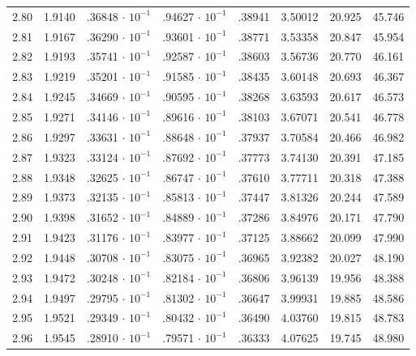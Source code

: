 \begin{minipage}{0.525\textwidth}
{\begin{tabular}{c|c|c|c|c|c|c|c}
        2.80 & 1.9140 & .36848$\,\cdot\,10^{-1}$ & .94627$\,\cdot\,10^{-1}$ & .38941 & 3.50012 & 20.925 & 45.746 \\
        2.81 & 1.9167 & .36290$\,\cdot\,10^{-1}$ & .93601$\,\cdot\,10^{-1}$ & .38771 & 3.53358 & 20.847 & 45.954 \\
        2.82 & 1.9193 & .35741$\,\cdot\,10^{-1}$ & .92587$\,\cdot\,10^{-1}$ & .38603 & 3.56736 & 20.770 & 46.161 \\
        2.83 & 1.9219 & .35201$\,\cdot\,10^{-1}$ & .91585$\,\cdot\,10^{-1}$ & .38435 & 3.60148 & 20.693 & 46.367 \\
        2.84 & 1.9245 & .34669$\,\cdot\,10^{-1}$ & .90595$\,\cdot\,10^{-1}$ & .38268 & 3.63593 & 20.617 & 46.573 \\
        2.85 & 1.9271 & .34146$\,\cdot\,10^{-1}$ & .89616$\,\cdot\,10^{-1}$ & .38103 & 3.67071 & 20.541 & 46.778 \\
        2.86 & 1.9297 & .33631$\,\cdot\,10^{-1}$ & .88648$\,\cdot\,10^{-1}$ & .37937 & 3.70584 & 20.466 & 46.982 \\
        2.87 & 1.9323 & .33124$\,\cdot\,10^{-1}$ & .87692$\,\cdot\,10^{-1}$ & .37773 & 3.74130 & 20.391 & 47.185 \\
        2.88 & 1.9348 & .32625$\,\cdot\,10^{-1}$ & .86747$\,\cdot\,10^{-1}$ & .37610 & 3.77711 & 20.318 & 47.388 \\
        2.89 & 1.9373 & .32135$\,\cdot\,10^{-1}$ & .85813$\,\cdot\,10^{-1}$ & .37447 & 3.81326 & 20.244 & 47.589 \\
        2.90 & 1.9398 & .31652$\,\cdot\,10^{-1}$ & .84889$\,\cdot\,10^{-1}$ & .37286 & 3.84976 & 20.171 & 47.790 \\
        2.91 & 1.9423 & .31176$\,\cdot\,10^{-1}$ & .83977$\,\cdot\,10^{-1}$ & .37125 & 3.88662 & 20.099 & 47.990 \\
        2.92 & 1.9448 & .30708$\,\cdot\,10^{-1}$ & .83075$\,\cdot\,10^{-1}$ & .36965 & 3.92382 & 20.027 & 48.190 \\
        2.93 & 1.9472 & .30248$\,\cdot\,10^{-1}$ & .82184$\,\cdot\,10^{-1}$ & .36806 & 3.96139 & 19.956 & 48.388 \\
        2.94 & 1.9497 & .29795$\,\cdot\,10^{-1}$ & .81302$\,\cdot\,10^{-1}$ & .36647 & 3.99931 & 19.885 & 48.586 \\
        2.95 & 1.9521 & .29349$\,\cdot\,10^{-1}$ & .80432$\,\cdot\,10^{-1}$ & .36490 & 4.03760 & 19.815 & 48.783 \\
        2.96 & 1.9545 & .28910$\,\cdot\,10^{-1}$ & .79571$\,\cdot\,10^{-1}$ & .36333 & 4.07625 & 19.745 & 48.980 \\

\end{tabular}}
\end{minipage}
